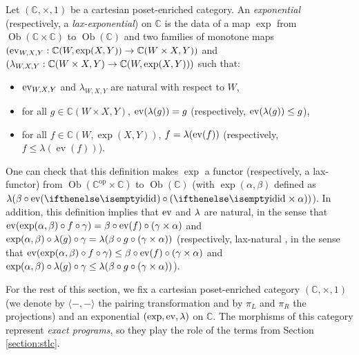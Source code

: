 \begin{definition} Let $(\mathbb{C}, \times, 1)$ be a cartesian poset-enriched category. An \emph{exponential} (respectively, a \emph{lax-exponential}) on $\mathbb{C}$ is the data of a map $\exp$ from $\operatorname{Ob}(\mathbb{C} \times \mathbb{C})$ to $\operatorname{Ob}(\mathbb{C})$ and two families of monotone maps $(\operatorname{ev}_{W,X,Y} : \mathbb{C}(W, \operatorname{exp}(X,Y)) \to \mathbb{C}(W \times X, Y))$ and $(\lambda_{W,X,Y} : \mathbb{C}(W \times X, Y) \to \mathbb{C}(W, \exp(X,Y)))$ such that: \begin{itemize}
\item $\operatorname{ev}_{W,X,Y}$ and $\lambda_{W,X,Y}$ are natural with respect to $W$,
\item for all $g \in \mathbb{C}(W \times X, Y)$, $\operatorname{ev}(\lambda(g)) = g$ (respectively, $\operatorname{ev}(\lambda(g)) \leq g$),
\item for all $f \in \mathbb{C}(W, \exp(X,Y))$, $f = \lambda(\operatorname{ev}(f))$ (respectively, $f \leq \lambda(\operatorname{ev}(f))$).
\end{itemize}
\end{definition}

One can check that this definition makes $\exp$ a functor (respectively, a lax-functor) from $\operatorname{Ob}(\mathbb{C}^{\operatorname{op}} \times \mathbb{C})$ to $\operatorname{Ob}(\mathbb{C})$ (with
$\exp(\alpha,\beta)$ defined as $\lam(\beta\circ\ev(\id)\circ(\id\times\alpha))$). In addition, this definition implies that $\operatorname{ev}$ and $\lambda$ are natural, in the sense that $\operatorname{ev}(\exp(\alpha,\beta)\circ f\circ\gamma) = \beta\circ\operatorname{ev}(f)\circ(\gamma\times\alpha)$ and $\exp(\alpha,\beta)\circ\lambda(g)\circ\gamma = \lambda(\beta\circ g\circ(\gamma\times\alpha))$ (respectively, lax-natural \cite{hilken:2-lambda}, in the sense that $\operatorname{ev}(\exp(\alpha,\beta)\circ f\circ\gamma) \leq \beta\circ\operatorname{ev}(f)\circ(\gamma\times\alpha)$ and $\exp(\alpha,\beta)\circ\lambda(g)\circ\gamma \leq \lambda(\beta\circ g\circ(\gamma\times\alpha))$).

For the rest of this section, we fix a cartesian poset-enriched category $(\mathbb{C}, \times, 1)$ (we denote by $\langle-,-\rangle$ the pairing transformation and by $\pi_L$ and $\pi_R$ the projections) and an exponential $(\exp, \operatorname{ev}, \lambda)$ on $\mathbb{C}$. The morphisms of this category represent \emph{exact programs}, so they play the role of the terms from Section \ref{section:stlc}.

